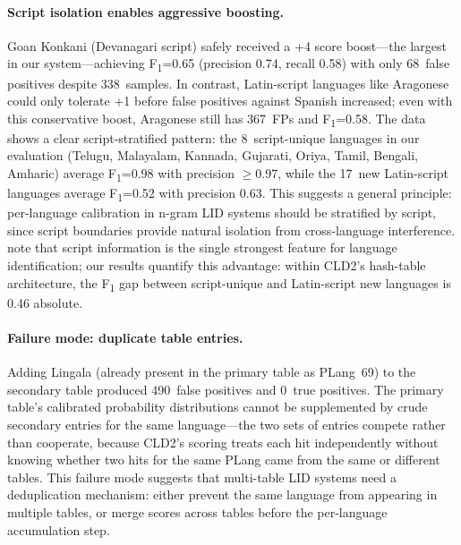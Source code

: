 \documentclass{article}
\newcommand{\fone}{F\textsubscript{1}}
\begin{document}
\paragraph{Script isolation enables aggressive boosting.}
Goan Konkani (Devanagari script) safely received a +4 score boost---the largest in our system---achieving \fone{}=0.65 (precision 0.74, recall 0.58) with only 68~false positives despite 338~samples.
In contrast, Latin-script languages like Aragonese could only tolerate +1 before false positives against Spanish increased; even with this conservative boost, Aragonese still has 367~FPs and \fone{}=0.58.
The data shows a clear script-stratified pattern: the 8~script-unique languages in our evaluation (Telugu, Malayalam, Kannada, Gujarati, Oriya, Tamil, Bengali, Amharic) average \fone{}=0.98 with precision $\geq$0.97, while the 17~new Latin-script languages average \fone{}=0.52 with precision 0.63.
This suggests a general principle: per-language calibration in n-gram LID systems should be stratified by script, since script boundaries provide natural isolation from cross-language interference.
\citet{jauhiainen2019automatic} note that script information is the single strongest feature for language identification; our results quantify this advantage: within CLD2's hash-table architecture, the \fone{} gap between script-unique and Latin-script new languages is 0.46 absolute.

\paragraph{Failure mode: duplicate table entries.}
Adding Lingala (already present in the primary table as PLang~69) to the secondary table produced 490~false positives and 0~true positives.
The primary table's calibrated probability distributions cannot be supplemented by crude secondary entries for the same language---the two sets of entries compete rather than cooperate, because CLD2's scoring treats each hit independently without knowing whether two hits for the same PLang came from the same or different tables.
This failure mode suggests that multi-table LID systems need a deduplication mechanism: either prevent the same language from appearing in multiple tables, or merge scores across tables before the per-language accumulation step.
\end{document}
